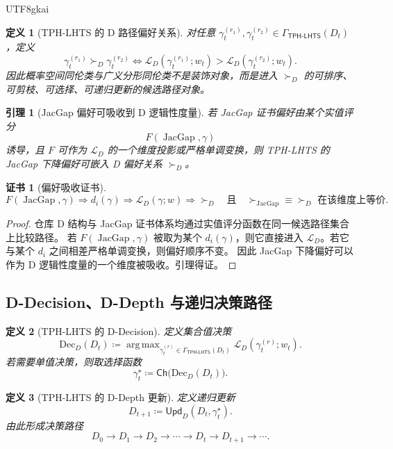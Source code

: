 \documentclass[12pt]{article}
\newtheorem{definition}{定义}[section]
\newtheorem{lemma}{引理}[section]
\newtheorem{Certificate}{证书}[section]
\newcommand{\TPHLHTS}{\ensuremath{\mathsf{TPH\mbox{-}LHTS}}}
\newcommand{\DefEq}{\coloneqq}
\DeclareMathOperator{\JacGap}{JacGap}
\DeclareMathOperator*{\argmax}{arg\,max}
\begin{document}
\begin{CJK*}{UTF8}{gkai}
\begin{definition}[TPH-LHTS 的 D 路径偏好关系]
对任意 \(\gamma_t^{(r_1)},\gamma_t^{(r_2)}\in\Gamma_{\TPHLHTS}(D_t)\)，定义
\[
\boxed{
\gamma_t^{(r_1)}\succ_D\gamma_t^{(r_2)}
\Longleftrightarrow
\mathcal L_D(\gamma_t^{(r_1)};w_t)>
\mathcal L_D(\gamma_t^{(r_2)};w_t).
}
\]
因此概率空间同伦类与广义分形同伦类不是装饰对象，而是进入
\(\succ_D\) 的可排序、可剪枝、可选择、可递归更新的候选路径对象。
\end{definition}

\begin{lemma}[JacGap 偏好可吸收到 D 逻辑性度量]
若 JacGap 证书偏好由某个实值评分
\[
F(\JacGap,\gamma)
\]
诱导，且 \(F\) 可作为 \(\mathcal L_D\) 的一个维度投影或严格单调变换，则
TPH-LHTS 的 JacGap 下降偏好可嵌入 D 偏好关系 \(\succ_D\)。
\end{lemma}

\begin{Certificate}[偏好吸收证书]
\[
\boxed{
F(\JacGap,\gamma)
\Rightarrow
d_i(\gamma)
\Rightarrow
\mathcal L_D(\gamma;w)
\Rightarrow
\succ_D
\quad
\text{且}
\quad
\succ_{\JacGap}\equiv\succ_D\text{ 在该维度上等价}.
}
\]
\end{Certificate}

\begin{proof}
仓库 D 结构与 JacGap 证书体系均通过实值评分函数在同一候选路径集合上比较路径。
若 \(F(\JacGap,\gamma)\) 被取为某个 \(d_i(\gamma)\)，则它直接进入
\(\mathcal L_D\)。若它与某个 \(d_i\) 之间相差严格单调变换，则偏好顺序不变。
因此 JacGap 下降偏好可以作为 D 逻辑性度量的一个维度被吸收。引理得证。
\end{proof}

\subsection{D-Decision、D-Depth 与递归决策路径}
\label{subsec:d-decision-depth-recursive-path}

\begin{definition}[TPH-LHTS 的 D-Decision]
定义集合值决策
\[
\mathrm{Dec}_D(D_t)
\DefEq
\argmax_{\gamma_t^{(r)}\in\Gamma_{\TPHLHTS}(D_t)}
\mathcal L_D(\gamma_t^{(r)};w_t).
\]
若需要单值决策，则取选择函数
\[
\boxed{
\gamma_t^\star
\DefEq
\mathsf{Ch}\bigl(\mathrm{Dec}_D(D_t)\bigr).
}
\]
\end{definition}

\begin{definition}[TPH-LHTS 的 D-Depth 更新]
定义递归更新
\[
\boxed{
D_{t+1}
\DefEq
\mathsf{Upd}_D(D_t,\gamma_t^\star).
}
\]
由此形成决策路径
\[
\boxed{
D_0\to D_1\to D_2\to\cdots\to D_t\to D_{t+1}\to\cdots.
}
\]
\end{definition}


\end{CJK*}
\end{document}
